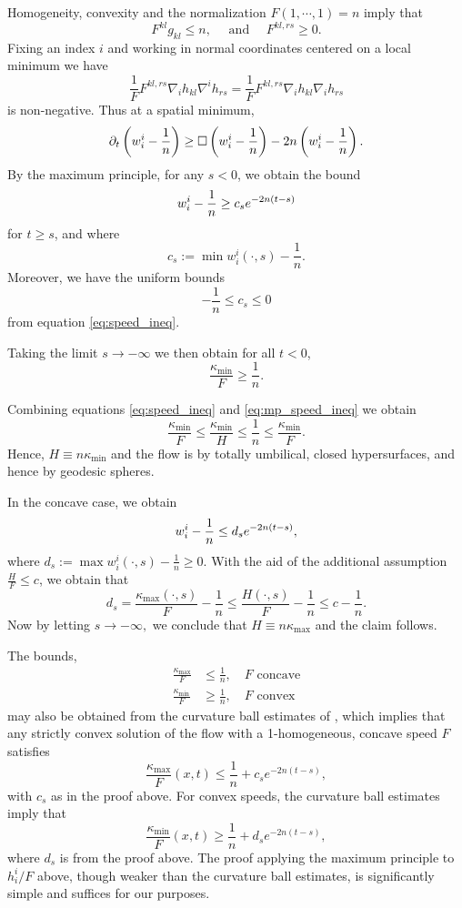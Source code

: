 \documentclass{amsart}
\begin{document}
{Homogeneity, convexity and the normalization \(F(1, \cdots, 1) = n\) imply that
\[
F^{kl}g_{kl} \leq n, \quad \text{ and }\quad  F^{kl,rs} \geq 0.
\]
Fixing an index \(i\) and working in normal coordinates centered on a local minimum we have
\[
\frac{1}{F} F^{kl,rs} \nabla_i h_{kl} \nabla^i h_{rs} = \frac{1}{F} F^{kl,rs} \nabla_i h_{kl} \nabla_i h_{rs}
\]
is non-negative. Thus at a spatial minimum,
\begin{align*}
\partial_t \left(w^i_i-\frac{1}{n}\right) \geq \Box\left(w^i_i-\frac{1}{n}\right) - 2n\left(w^i_i-\frac{1}{n}\right).
\end{align*}
By the maximum principle, for any $s<0$, we obtain the bound
\begin{align*}
w^i_i-\frac{1}{n} \geq c_s e^{-2n(t-s)}
\end{align*}
for $t\geq s$, and where
\[
c_s := \min w^i_i(\cdot, s)- \frac{1}{n}.
\]
Moreover, we have the uniform bounds
\[
-\frac{1}{n} \leq c_s \leq 0
\]
from equation \eqref{eq:speed_ineq}.

Taking the limit $s\to -\infty$ we then obtain for all $t < 0$,
\begin{equation}
\label{eq:mp_speed_ineq}
\frac{\kappa_{\min}}{F} \geq \frac{1}{n}.
\end{equation}

Combining equations \eqref{eq:speed_ineq} and \eqref{eq:mp_speed_ineq} we obtain
\[
\frac{\kappa_{\min}}{F} \leq \frac{\kappa_{\min}}{H} \leq \frac{1}{n} \leq \frac{\kappa_{\min}}{F}.
\]
Hence, $H\equiv n \kappa_{\min}$ and the flow is by totally umbilical, closed hypersurfaces, and hence by geodesic spheres.

In the concave case, we obtain
\begin{align*}
w^i_i-\frac{1}{n} \leq d_s e^{-2n(t-s)},
\end{align*}
where
$
d_s := \max w^i_i(\cdot, s) - \frac{1}{n}\geq 0.
$
With the aid of the additional assumption \(\tfrac{H}{F} \leq c\), we obtain that 
\[d_s=\frac{\kappa_{\max}(\cdot, s)}{F}  -\frac{1}{n}\leq \frac{H(\cdot, s)}{F}-\frac{1}{n} \leq c-\frac{1}{n}.\]
Now by letting $s\to-\infty,$ we conclude that $H \equiv n \kappa_{\max}$ and the claim follows.
}
\begin{rem}
The bounds, 
\[
\begin{split}
\frac{\kappa_{\max}}{F} &\leq \frac{1}{n}, \quad \text{$F$ concave} \\
\frac{\kappa_{\min}}{F} &\geq \frac{1}{n}, \quad \text{$F$ convex}
\end{split}
\]
may also be obtained from the curvature ball estimates of \cite[Theorem 1.1]{AndrewsHanLiWei:/2015}, which implies that any strictly convex solution of the flow with a 1-homogeneous, concave speed $F$ satisfies
\[
\frac{\kappa_{\max}}{F}(x,t) \leq \frac{1}{n}+c_se^{-2n(t-s)},
\]
with \(c_s\) as in the proof above. For convex speeds, the curvature ball estimates imply that
\[
\frac{\kappa_{\min}}{F}(x,t)\geq \frac{1}{n}+d_se^{-2n(t-s)},
\]
where \(d_s\) is from the proof above. The proof applying the maximum principle to \(h^i_i/F\) above, though weaker than the curvature ball estimates, is significantly simple and suffices for our purposes.
\end{rem}
\end{document}
